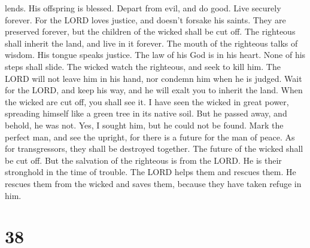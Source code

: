 lends. His offspring is blessed.  Depart from evil, and do
good. Live securely forever.  For the LORD loves justice,
and doesn't forsake his saints. They are preserved forever, but the
children of the wicked shall be cut off.  The righteous
shall inherit the land, and live in it forever.  The mouth
of the righteous talks of wisdom. His tongue speaks justice.
 The law of his God is in his heart. None of his steps
shall slide.  The wicked watch the righteous, and seek to
kill him.  The LORD will not leave him in his hand, nor
condemn him when he is judged.  Wait for the LORD, and keep
his way, and he will exalt you to inherit the land. When the wicked are
cut off, you shall see it.  I have seen the wicked in great
power, spreading himself like a green tree in its native soil.
 But he passed away, and behold, he was not. Yes, I sought
him, but he could not be found.  Mark the perfect man, and
see the upright, for there is a future for the man of peace.
 As for transgressors, they shall be destroyed together.
The future of the wicked shall be cut off.  But the
salvation of the righteous is from the LORD. He is their stronghold in
the time of trouble.  The LORD helps them and rescues them.
He rescues them from the wicked and saves them, because they have taken
refuge in him.

\hypertarget{section-37}{%
\section{38}\label{section-37}}

